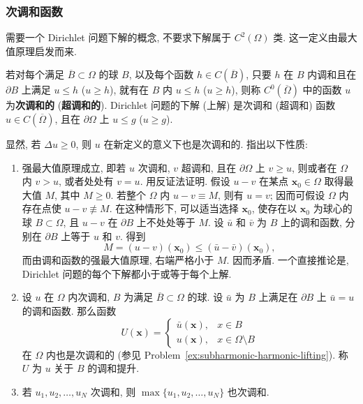 \subsubsection{次调和函数}\label{subsec:subharmonic-functions}

需要一个 Dirichlet 问题下解的概念, 不要求下解属于 $C^2(\Omega)$ 类. 这一定义由最大值原理启发而来.

\begin{Definition}
\label{def:continuous-subharmonic-function}
若对每个满足 $\overline B\subset\Omega$ 的球 $B$, 以及每个函数 $h\in C(\overline B)$, 只要 $h$ 在 $B$ 内调和且在 $\partial B$ 上满足 $u\leq h$ ($u\geq h$), 就有在 $B$ 内 $u\leq h$ ($u\geq h$), 则称 $C^0(\overline\Omega)$ 中的函数 $u$ 为\textbf{次调和的} (\textbf{超调和的}). Dirichlet 问题的下解 (上解) 是次调和 (超调和) 函数 $u\in C(\overline\Omega)$, 且在 $\partial\Omega$ 上 $u\leq g$ ($u\geq g$).
\end{Definition}

显然, 若 $\Delta u\geq0$, 则 $u$ 在新定义的意义下也是次调和的. 指出以下性质:

\begin{enumerate}
\item 强最大值原理成立, 即若 $u$ 次调和, $v$ 超调和, 且在 $\partial\Omega$ 上 $v\geq u$, 则或者在 $\Omega$ 内 $v>u$, 或者处处有 $v=u$. 用反证法证明. 假设 $u-v$ 在某点 $\bm{x}_0\in\Omega$ 取得最大值 $M$, 其中 $M\geq0$. 若整个 $\Omega$ 内 $u-v\equiv M$, 则有 $u=v$; 因而可假设 $\Omega$ 内存在点使 $u-v\not\equiv M$. 在这种情形下, 可以适当选择 $\bm{x}_0$, 使存在以 $\bm{x}_0$ 为球心的球 $B\subset\Omega$, 且 $u-v$ 在 $\partial B$ 上不处处等于 $M$. 设 $\bar u$ 和 $\bar v$ 为 $B$ 上的调和函数, 分别在 $\partial B$ 上等于 $u$ 和 $v$. 得到
\begin{equation}\label{eq:subharmonic-difference-at-maximum}
M=(u-v)(\bm{x}_0)\leq(\bar u-\bar v)(\bm{x}_0),
\end{equation}
而由调和函数的强最大值原理, 右端严格小于 $M$. 因而矛盾. 一个直接推论是, Dirichlet 问题的每个下解都小于或等于每个上解.\item 设 $u$ 在 $\Omega$ 内次调和, $B$ 为满足 $\overline B\subset\Omega$ 的球. 设 $\bar u$ 为 $B$ 上满足在 $\partial B$ 上 $\bar u=u$ 的调和函数. 那么函数
\begin{equation}\label{eq:subharmonic-harmonic-lifting}
U(\bm{x})=\begin{cases}\bar u(\bm{x}),&x\in B\\u(\bm{x}),&x\in\Omega\setminus B\end{cases}
\end{equation}
在 $\Omega$ 内也是次调和的 (参见 Problem~\ref{ex:subharmonic-harmonic-lifting}). 称 $U$ 为 $u$ 关于 $B$ 的调和提升.\item 若 $u_1,u_2,\ldots,u_N$ 次调和, 则 $\max\{u_1,u_2,\ldots,u_N\}$ 也次调和.\end{enumerate}
